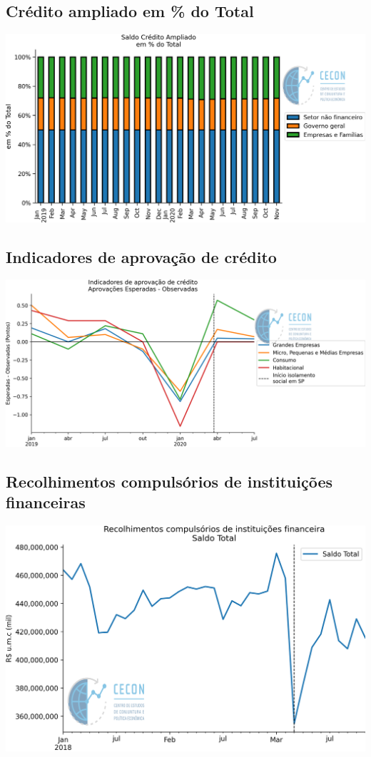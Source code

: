 \documentclass{SelfArx}
\begin{document}
\subsection*{Crédito ampliado em \% do Total}
\label{sec:org58332da}

\begin{center}
\includegraphics[width=.9\linewidth]{./figs/Credito/SaldoCreditoAmpliado_Total.png}
\end{center}

\subsection*{Indicadores de aprovação de crédito}
\label{sec:org2462ecd}

\begin{center}
\includegraphics[width=.9\linewidth]{./figs/Credito/PTC.png}
\end{center}

\subsection*{Recolhimentos compulsórios de instituições financeiras}
\label{sec:org5b6f695}

\begin{center}
\includegraphics[width=.9\linewidth]{./figs/Credito/Recolhimentos_Total.png}
\end{center}
\end{document}
